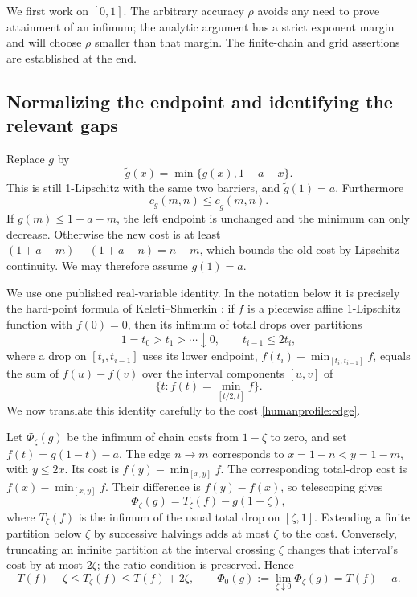 We first work on \([0,1]\). The arbitrary accuracy \(\rho\) avoids
any need to prove attainment of an infimum; the analytic argument has
a strict exponent margin and will choose \(\rho\) smaller than that
margin. The finite-chain and grid assertions are established at the end.

\subsection{Normalizing the endpoint and identifying the relevant gaps}

Replace \(g\) by
\[
 \widetilde g(x)=\min\{g(x),1+a-x\}.
\]
This is still 1-Lipschitz with the same two barriers, and
\(\widetilde g(1)=a\). Furthermore
\begin{equation}\label{humanprofile:normalization}
 c_g(m,n)\le c_{\widetilde g}(m,n).
\end{equation}
If \(g(m)\le1+a-m\), the left endpoint is unchanged and the
minimum can only decrease. Otherwise the new cost is at least
\((1+a-m)-(1+a-n)=n-m\), which bounds the old cost by
Lipschitz continuity. We may therefore assume \(g(1)=a\).

We use one published real-variable identity. In the notation below it
is precisely the hard-point formula of Keleti--Shmerkin
\cite[Lemma 5.4]{ks}:
if \(f\) is a piecewise affine 1-Lipschitz function with \(f(0)=0\),
then its infimum of total drops over partitions
\[
 1=t_0>t_1>\cdots\downarrow0,\qquad t_{i-1}\le2t_i,
\]
where a drop on \([t_i,t_{i-1}]\) uses its lower endpoint,
\(f(t_i)-\min_{[t_i,t_{i-1}]}f\), equals the sum of
\(f(u)-f(v)\) over the interval components \([u,v]\) of
\[
 \{t:f(t)=\min_{[t/2,t]}f\}.
\]
We now translate this identity carefully to the cost
\eqref{humanprofile:edge}.

Let \(\Phi_\zeta(g)\) be the infimum of chain costs from \(1-\zeta\)
to zero, and set \(f(t)=g(1-t)-a\). The edge \(n\to m\)
corresponds to \(x=1-n<y=1-m\), with \(y\le2x\).
Its cost is \(f(y)-\min_{[x,y]}f\). The corresponding
total-drop cost is \(f(x)-\min_{[x,y]}f\). Their difference is
\(f(y)-f(x)\), so telescoping gives
\[
 \Phi_\zeta(g)=T_\zeta(f)-g(1-\zeta),
\]
where \(T_\zeta(f)\) is the infimum of the usual total drop on
\([\zeta,1]\). Extending a finite partition below \(\zeta\) by
successive halvings adds at most \(\zeta\) to the cost.
Conversely, truncating an infinite partition at the interval crossing
\(\zeta\) changes that interval's cost by at most \(2\zeta\);
the ratio condition is preserved. Hence
\[
 T(f)-\zeta\le T_\zeta(f)\le T(f)+2\zeta,
 \qquad
 \Phi_0(g):=\lim_{\zeta\downarrow0}\Phi_\zeta(g)=T(f)-a.
\]

